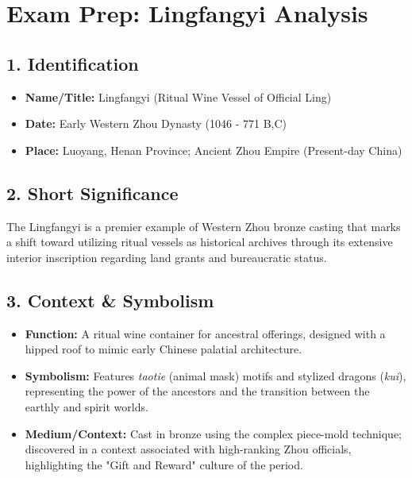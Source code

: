 \documentclass{article}
\begin{document}
\section*{Exam Prep: Lingfangyi Analysis}

\subsection*{1. Identification}
\begin{itemize}[noitemsep]
    \item \textbf{Name/Title:} Lingfangyi (Ritual Wine Vessel of Official Ling)
    \item \textbf{Date:} Early Western Zhou Dynasty (1046 - 771 B,C)
    \item \textbf{Place:} Luoyang, Henan Province; Ancient Zhou Empire (Present-day China)
\end{itemize}

\subsection*{2. Short Significance}
The Lingfangyi is a premier example of Western Zhou bronze casting that marks a shift toward utilizing ritual vessels as historical archives through its extensive interior inscription regarding land grants and bureaucratic status.

\subsection*{3. Context \& Symbolism}
\begin{itemize}
    \item \textbf{Function:} A ritual wine container for ancestral offerings, designed with a hipped roof to mimic early Chinese palatial architecture.
    \item \textbf{Symbolism:} Features \textit{taotie} (animal mask) motifs and stylized dragons (\textit{kui}), representing the power of the ancestors and the transition between the earthly and spirit worlds.
    \item \textbf{Medium/Context:} Cast in bronze using the complex piece-mold technique; discovered in a context associated with high-ranking Zhou officials, highlighting the "Gift and Reward" culture of the period.
\end{itemize}
\end{document}
